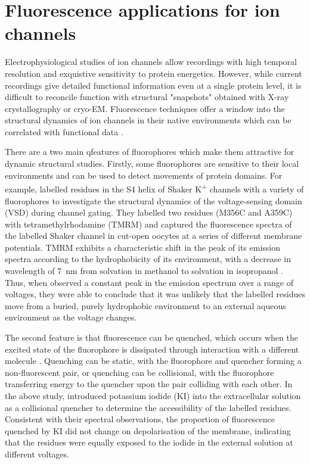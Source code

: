 \section{Fluorescence applications for ion channels}

Electrophysiological studies of ion channels allow recordings with high temporal resolution and exquistive sensitivity to protein energetics.
However, while current recordings give detailed functional information even at a single protein level, it is difficult to reconcile function with structural "snapshots" obtained with X-ray crystallography or cryo-EM.
Fluorescence techniques offer a window into the structural dynamics of ion channels in their native environments which can be correlated with functional data \cite{zheng_handbook_2015}.

There are a two main qfeatures of fluorophores which make them attractive for dynamic structural studies.
Firstly, some fluorophores are sensitive to their local environments and can be used to detect movements of protein domains.
For example, \citeauthor{cha_characterizing_1997} labelled residues in the S4 helix of Shaker K\textsuperscript{+} channels with a variety of fluorophores to investigate the structural dynamics of the voltage-sensing domain (VSD) during channel gating.
They labelled two residues (M356C and A359C) with tetramethylrhodamine (TMRM) and captured the fluorescence spectra of the labelled Shaker channel in cut-open oocytes at a series of different membrane potentials.
TMRM exhibits a characteristic shift in the peak of its emission spectra according to the hydrophobicity of its environment, with a decrease in wavelength of \SI{7}{\nano\metre} from solvation in methanol to solvation in isopropanol \cite{cha_characterizing_1997}.
Thus, when \citeauthor{cha_characterizing_1997} observed a constant peak in the emission spectrum over a range of voltages, they were able to conclude that it was unlikely that the labelled residues move from a buried, purely hydrophobic environment to an external aqueous environment as the voltage changes.

The second feature is that fluorescence can be quenched, which occurs when the excited state of the fluorophore is dissipated through interaction with a different molecule \cite{zheng_handbook_2015}.
Quenching can be static, with the fluorophore and quencher forming a non-fluorescent pair, or quenching can be collisional, with the fluorophore transferring energy to the quencher upon the pair colliding with each other.
In the above study, \citeauthor{cha_characterizing_1997} introduced potassium iodide (KI) into the extracellular solution as a collisional quencher to determine the accessibility of the labelled residues.
Consistent with their spectral observations, the proportion of fluorescence quenched by KI did not change on depolarisation of the membrane, indicating that the residues were equally exposed to the iodide in the external solution at different voltages.

